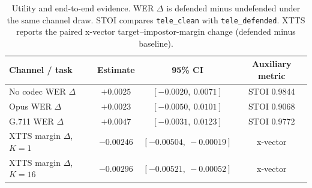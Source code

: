 \begin{table}[t]
  \centering
  \caption{Utility and end-to-end evidence. WER $\Delta$ is defended minus
  undefended under the same channel draw. STOI compares
  \texttt{tele\_clean} with \texttt{tele\_defended}. XTTS reports the paired
  x-vector target--impostor-margin change (defended minus baseline).}
  \label{tab:quality-cloning}
  \small
  \setlength{\tabcolsep}{4pt}
  \begin{tabular}{lccc}
    \toprule
    Channel / task & Estimate & 95\% CI & Auxiliary metric \\
    \midrule
    No codec WER $\Delta$ & $+0.0025$ & $[-0.0020,\ 0.0071]$ & STOI 0.9844 \\
    Opus WER $\Delta$ & $+0.0023$ & $[-0.0050,\ 0.0101]$ & STOI 0.9068 \\
    G.711 WER $\Delta$ & $+0.0047$ & $[-0.0031,\ 0.0123]$ & STOI 0.9772 \\
    XTTS margin $\Delta$, $K{=}1$ & $-0.00246$ & $[-0.00504,\ -0.00019]$ & x-vector \\
    XTTS margin $\Delta$, $K{=}16$ & $-0.00296$ & $[-0.00521,\ -0.00052]$ & x-vector \\
    \bottomrule
  \end{tabular}
\end{table}
